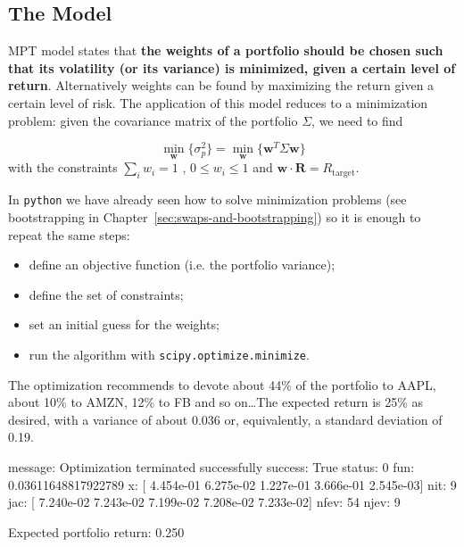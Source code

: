 \subsection{The Model}
\label{optimization}

MPT model states that \textbf{the weights of a portfolio should be chosen such that its volatility (or its variance) is minimized, given a certain level of return}. Alternatively weights can be found by maximizing the return given a certain level of risk. 
The application of this model reduces to a minimization problem: given the covariance matrix of the portfolio $\Sigma$, we need to find

\begin{equation}
\underset{\mathbf{w}}{\min}\{\sigma_p^2\} = \underset{\mathbf{w}}{\min}\{\mathbf{w}^T\Sigma\mathbf{w}\}
\end{equation}
with the constraints $\sum_{i}w_i = 1$ , $0 \le w_i \le 1$ and $\mathbf{w}\cdot\mathbf{R}=R_{\textrm{target}}$.

In \texttt{python} we have already seen how to solve minimization problems (see bootstrapping in Chapter~\ref{sec:swaps-and-bootstrapping}) so it is enough to repeat the same steps:

\begin{itemize}
\tightlist
\item define an objective function (i.e. the portfolio variance);
\item define the set of constraints;
\item set an initial guess for the weights;
\item run the algorithm with \texttt{scipy.optimize.minimize}.
\end{itemize}


The optimization recommends to devote about 44\% of the portfolio to AAPL, about 10\% to AMZN, 12\% to FB and so on\ldots The expected return is 25\% as desired, with a variance of about 0.036 or, equivalently, a standard deviation of 0.19.

\begin{ioutput}
 message: Optimization terminated successfully
 success: True
  status: 0
     fun: 0.03611648817922789
       x: [ 4.454e-01  6.275e-02  1.227e-01  3.666e-01  2.545e-03]
     nit: 9
     jac: [ 7.240e-02  7.243e-02  7.199e-02  7.208e-02  7.233e-02]
    nfev: 54
    njev: 9
       
Expected portfolio return: 0.250
\end{ioutput}

